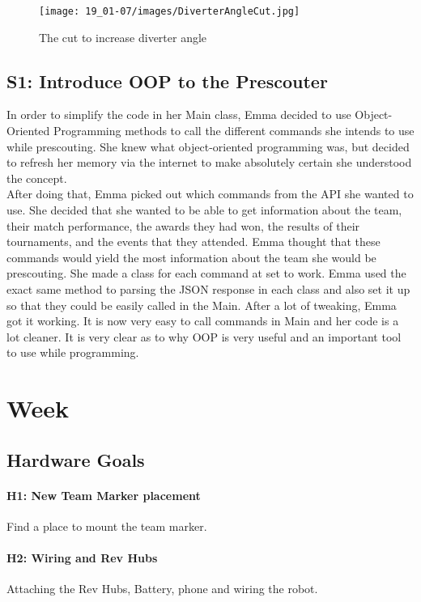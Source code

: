 \documentclass{article}
\begin{document}
\begin{figure}
    \centering
    \texttt{[image: 19\_01-07/images/DiverterAngleCut.jpg]}
    \caption{The cut to increase diverter angle}
    \label{fig:Cutout}
\end{figure}
\subsection{S1: Introduce OOP to the Prescouter}

In order to simplify the code in her Main class, Emma decided to use Object-Oriented Programming methods to call the different commands she intends to use while prescouting. She knew what object-oriented programming was, but decided to refresh her memory via the internet to make absolutely certain she understood the concept. \\

After doing that, Emma picked out which commands from the API she wanted to use. She decided that she wanted to be able to get information about the team, their match performance, the awards they had won, the results of their tournaments, and the events that they attended. Emma thought that these commands would yield the most information about the team she would be prescouting. She made a class for each command at set to work. Emma used the exact same method to parsing the JSON response in each class and also set it up so that they could be easily called in the Main. After a lot of tweaking, Emma got it working. It is now very easy to call commands in Main and her code is a lot cleaner. It is very clear as to why OOP is very useful and an important tool to use while programming. 
\clearpage \newpage \section{Week \thesection} 
\subsection{Hardware Goals}
\paragraph{H1: New Team Marker placement}
 Find a place to mount the team marker.
\paragraph{H2: Wiring and Rev Hubs}
 Attaching the Rev Hubs, Battery, phone and wiring the robot.
\end{document}
